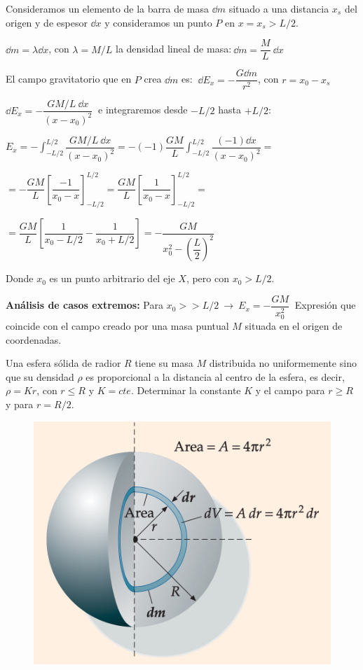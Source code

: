 Consideramos un elemento de la barra de masa $\dd m$ situado a una distancia $x_s$ del origen y de espesor $\dd x$ y consideramos un punto $P$ en $x=x_s>L/2$.

$\dd m = \lambda \dd x$, con $\lambda=M/L$ la densidad lineal de masa:$\ \dd m =\dfrac M L \ \dd x$

El campo gravitatorio que en $P$ crea $\dd m$ es: $\ \dd E_x=-\dfrac{G\dd m}{r^2}$, con $r=x_0-x_s$

$\dd E_x=-\dfrac{GM/L\ \dd x}{(x-x_0)^2}\ $ e integraremos desde $-L/2$ hasta $+L/2$:

$E_x=-\displaystyle \int_{-L/2}^{L/2} \dfrac{GM/L\ \dd x}{(x-x_0)^2} = -(-1)\dfrac{GM}{L} \int_{-L/2}^{L/2} \dfrac{(-1) \dd x}{(x-x_0)^2}= $

$\displaystyle =- \dfrac{GM}{L} \left[ \dfrac {-1} {x_0-x}  \right]_{-L/2}^{L/2} = \dfrac{GM}{L} \left[ \dfrac 1 {x_0-x}  \right]_{-L/2}^{L/2}=$

$\displaystyle = \dfrac{GM}{L} \left[ \dfrac{1}{x_0-L/2}-\dfrac{1}{x_0+L/2} \right] = -\dfrac{GM}{x_0^2-\left(\dfrac L 2 \right)^2}$

Donde $x_0$ es un punto arbitrario del eje $X$, pero con $x_0>L/2$.

\textbf{Análisis de casos extremos: } Para $x_0>>L/2 \ \to \ E_x=-\dfrac{GM}{x_0^2}\ $ Expresión que coincide con el campo creado por una masa puntual $M$ situada en el origen de coordenadas.

\begin{prob}
Una esfera sólida de radior $R$ tiene su masa $M$ distribuida no uniformemente sino que su densidad $\rho$ es proporcional a la distancia al centro de la esfera, es decir, $\rho=Kr$, con $r\leq R$ y $K=cte$. Determinar la constante $K$ y el campo para $r\geq R$ y para $r=R/2$.
\end{prob}

\begin{figure}[H]
	\centering
	\includegraphics[width=1\textwidth]{imagenes/imagenes15/T15IM12.png}
\end{figure}

